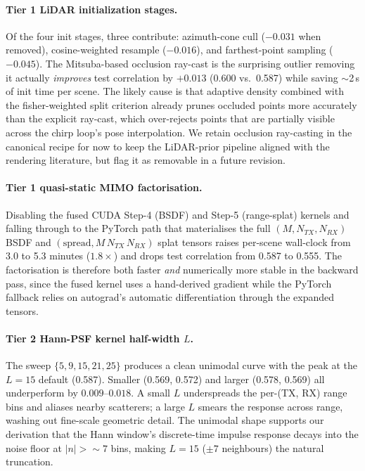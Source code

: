 \paragraph{Tier 1 \textemdash{} LiDAR initialization stages.} Of the four init stages, three contribute: azimuth-cone cull ($-0.031$ when removed), cosine-weighted resample ($-0.016$), and farthest-point sampling ($-0.045$). The Mitsuba-based occlusion ray-cast is the surprising outlier \textemdash{} removing it actually \emph{improves} test correlation by $+0.013$ (0.600 vs.~0.587) while saving $\sim$2\,s of init time per scene. The likely cause is that adaptive density combined with the fisher-weighted split criterion already prunes occluded points more accurately than the explicit ray-cast, which over-rejects points that are partially visible across the chirp loop's pose interpolation. We retain occlusion ray-casting in the canonical recipe for now to keep the LiDAR-prior pipeline aligned with the rendering literature, but flag it as removable in a future revision.

\paragraph{Tier 1 \textemdash{} quasi-static MIMO factorisation.} Disabling the fused CUDA Step-4 (BSDF) and Step-5 (range-splat) kernels and falling through to the PyTorch path that materialises the full $(M, N_{TX}, N_{RX})$ BSDF and $(\text{spread}, M\,N_{TX}\,N_{RX})$ splat tensors raises per-scene wall-clock from 3.0 to 5.3 minutes ($1.8\times$) and drops test correlation from 0.587 to 0.555. The factorisation is therefore both faster \emph{and} numerically more stable in the backward pass, since the fused kernel uses a hand-derived gradient while the PyTorch fallback relies on autograd's automatic differentiation through the expanded tensors.

\paragraph{Tier 2 \textemdash{} Hann-PSF kernel half-width $L$.} The sweep $\{5, 9, 15, 21, 25\}$ produces a clean unimodal curve with the peak at the $L{=}15$ default (0.587). Smaller (0.569, 0.572) and larger (0.578, 0.569) all underperform by $0.009$--$0.018$. A small $L$ underspreads the per-(TX, RX) range bins and aliases nearby scatterers; a large $L$ smears the response across range, washing out fine-scale geometric detail. The unimodal shape supports our derivation that the Hann window's discrete-time impulse response decays into the noise floor at $|n|{>}\sim 7$ bins, making $L{=}15$ ($\pm 7$ neighbours) the natural truncation.

